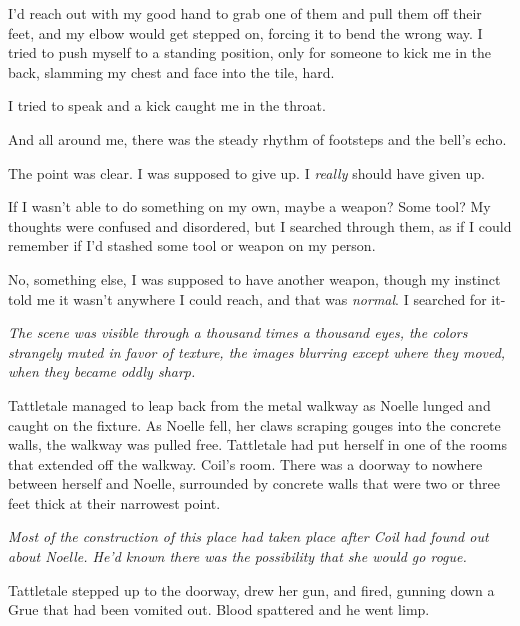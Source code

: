I'd reach out with my good hand to grab one of them and pull them off their feet, and my elbow would get stepped on, forcing it to bend the wrong way.  I tried to push myself to a standing position, only for someone to kick me in the back, slamming my chest and face into the tile, hard.



I tried to speak and a kick caught me in the throat.



And all around me, there was the steady rhythm of footsteps and the bell's echo.



The point was clear.  I was supposed to give up.  I \emph{really} should have given up.



If I wasn't able to do something on my own, maybe a weapon?  Some tool?  My thoughts were confused and disordered, but I searched through them, as if I could remember if I'd stashed some tool or weapon on my person.



No, something else, I was supposed to have another weapon, though my instinct told me it wasn't anywhere I could reach, and that was \emph{normal}.  I searched for it-



\blacksquare



\emph{The scene was visible through a thousand times a thousand eyes, the colors strangely muted in favor of texture, the images blurring except where they moved, when they became oddly sharp.}



Tattletale managed to leap back from the metal walkway as Noelle lunged and caught on the fixture.  As Noelle fell, her claws scraping gouges into the concrete walls, the walkway was pulled free.  Tattletale had put herself in one of the rooms that extended off the walkway.  Coil's room.  There was a doorway to nowhere between herself and Noelle, surrounded by concrete walls that were two or three feet thick at their narrowest point.



\emph{Most of the construction of this place had taken place after Coil had found out about Noelle.  He'd known there was the possibility that she would go rogue.}



Tattletale stepped up to the doorway, drew her gun, and fired, gunning down a Grue that had been vomited out.  Blood spattered and he went limp.



